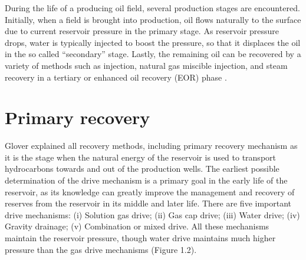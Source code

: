 During the life of a producing oil field, several production stages are 
encountered. Initially, when a field is brought into production, oil flows 
naturally to the surface due to current reservoir pressure in the primary stage. 
As reservoir pressure drops, water is typically injected to boost the pressure, 
so that it displaces the oil in the so called ``secondary'' stage. Lastly, the 
remaining oil can be recovered by a variety of methods such as  injection, natural gas 
miscible injection, and steam recovery in a tertiary or enhanced oil recovery (EOR) 
phase 
\citep{Meyer}. 

\section{Primary recovery}
Glover \citep{Glover} explained all recovery methods, 
including primary recovery mechanism as it is the stage when the natural energy 
of the reservoir is used to transport hydrocarbons towards and out of the 
production wells. The earliest possible determination of the drive mechanism is 
a primary goal in the early life of the reservoir, as its knowledge can greatly 
improve the management and recovery of reserves from the reservoir in its middle 
and later life. There are five important drive mechanisms: (i) Solution gas 
drive; (ii) Gas cap drive; (iii) Water drive; (iv) Gravity drainage; (v) 
Combination or mixed drive. All these mechanisms maintain the reservoir pressure, 
though water drive maintains much higher pressure than the gas drive mechanisms (Figure 1.2).

